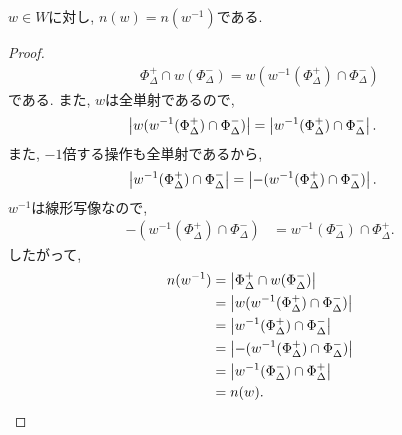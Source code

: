 \begin{prop}
  \label{prop:n:inverse:same}
  $w\in W$に対し,
  $n(w)=n(w^{-1})$である.
\end{prop}
\begin{proof}
  \begin{align*}
    \Phi_\Delta^+\cap w(\Phi_\Delta^{-})=w(w^{-1}(\Phi_\Delta^+)\cap \Phi_\Delta^{-})
  \end{align*}
  である. また, $w$は全単射であるので,
  \begin{align*}
    \left|w(w^{-1}(\Phi_\Delta^+)\cap \Phi_\Delta^{-})\right|
    &=\left|w^{-1}(\Phi_\Delta^+)\cap \Phi_\Delta^{-}\right|.
  \end{align*}
  また, $-1$倍する操作も全単射であるから,
  \begin{align*}
    \left|w^{-1}(\Phi_\Delta^+)\cap \Phi_\Delta^{-}\right|
    &=\left|-(w^{-1}(\Phi_\Delta^+)\cap \Phi_\Delta^{-})\right|.
  \end{align*}
  $w^{-1}$は線形写像なので,
  \begin{align*}
    -(w^{-1}(\Phi_\Delta^+)\cap \Phi_\Delta^{-})
    &= w^{-1}(\Phi_\Delta^-)\cap \Phi_\Delta^{+}.
  \end{align*}
  したがって,
  \begin{align*}
    n(w^{-1})
    &=\left|\Phi_\Delta^+\cap w(\Phi_\Delta^{-})\right|\\
    &=\left|w(w^{-1}(\Phi_\Delta^+)\cap \Phi_\Delta^{-})\right|\\
    &=\left|w^{-1}(\Phi_\Delta^+)\cap \Phi_\Delta^{-}\right|\\
    &=\left|-(w^{-1}(\Phi_\Delta^+)\cap \Phi_\Delta^{-})\right|\\
    &=\left|w^{-1}(\Phi_\Delta^-)\cap \Phi_\Delta^{+}\right|\\
    &=n(w).
  \end{align*}
\end{proof}

